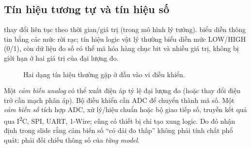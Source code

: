 \subsection{Tín hiệu tương tự và tín hiệu số}
 thay đổi liên tục theo thời gian/giá trị (trong mô hình lý tưởng).  biểu diễn thông tin bằng các mức rời rạc; tín hiệu logic vật lý thường biểu diễn mức LOW/HIGH (0/1), còn dữ liệu đo số có thể mã hóa hàng chục bit và nhiều giá trị, không bị giới hạn ở hai giá trị của đại lượng đo.

\begin{figure}[htbp]\centering
{}
\caption{Hai dạng tín hiệu thường gặp ở đầu vào vi điều khiển.}
\end{figure}

Một \emph{cảm biến analog} có thể xuất điện áp tỷ lệ đại lượng đo (hoặc thay đổi điện trở cần mạch phân áp). Bộ điều khiển cần ADC để chuyển thành mã số. Một \emph{cảm biến số} tích hợp ADC, xử lý/hiệu chuẩn hoặc bộ giao tiếp số, truyền kết quả qua I\textsuperscript{2}C, SPI, UART, 1-Wire; cũng có thiết bị chỉ tạo xung logic. Do đó nhận định trong slide rằng cảm biến số ``có dải đo thấp'' không phải tính chất phổ quát: phải đối chiếu thông số của \emph{từng model}.


